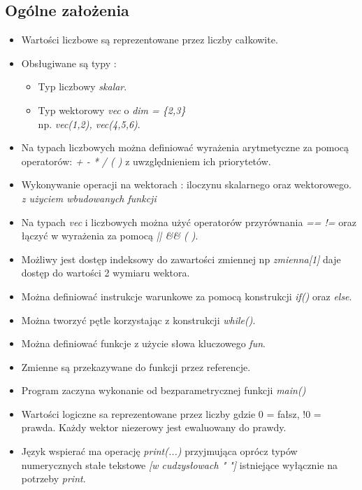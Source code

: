 \documentclass[11pt]{article} %
\begin{document}
\subsection{Ogólne założenia}
\begin{itemize}
	\item 
		Wartości liczbowe są reprezentowane przez liczby całkowite.
	\item
		Obsługiwane są typy : 
		\begin{itemize}
			\item 
				Typ liczbowy \textsl{skalar}.
			\item
				Typ wektorowy \textsl{vec} o \textsl{dim = \{2,3\}}\\ np. \textsl{vec(1,2), vec(4,5,6)}.
		\end{itemize}
	\item
		Na typach liczbowych można definiować wyrażenia arytmetyczne za pomocą operatorów: \textsl{+ - * / ( )} z uwzględnieniem ich priorytetów.
	\item
		Wykonywanie operacji na wektorach : iloczynu skalarnego oraz wektorowego. \textsl{z użyciem wbudowanych funkcji}
	\item
		Na typach \textsl{vec} i liczbowych można użyć operatorów przyrównania \textsl{== !=} oraz łączyć w wyrażenia za pomocą \textsl{|| \&\& ( )}.
	\item
		Możliwy jest dostęp indeksowy do zawartości zmiennej np \textsl{ zmienna[1]} daje dostęp do wartości 2 wymiaru wektora. 
	\item
		Można definiować instrukcje warunkowe za pomocą konstrukcji \textsl{if()} oraz \textsl{else}.
	\item
		Można tworzyć pętle korzystając z konstrukcji \textsl{while()}.
	\item
		Można definiować funkcje z użycie słowa kluczowego \textsl{fun}.
	\item
		Zmienne są przekazywane do funkcji przez referencje.
	\item
		Program zaczyna wykonanie od bezparametrycznej funkcji \textsl{main()}
	\item 
		Wartości logiczne sa reprezentowane przez liczby gdzie 0 = fałsz, !0 = prawda. Każdy wektor niezerowy jest ewaluowany do prawdy.
	\item
		Język wspierać ma operację \textsl{print(...)} przyjmująca oprócz typów numerycznych stałe tekstowe \textsl{[w cudzysłowach " "]} istniejące wyłącznie na potrzeby \textsl{print}.
\end{itemize}
\end{document}
